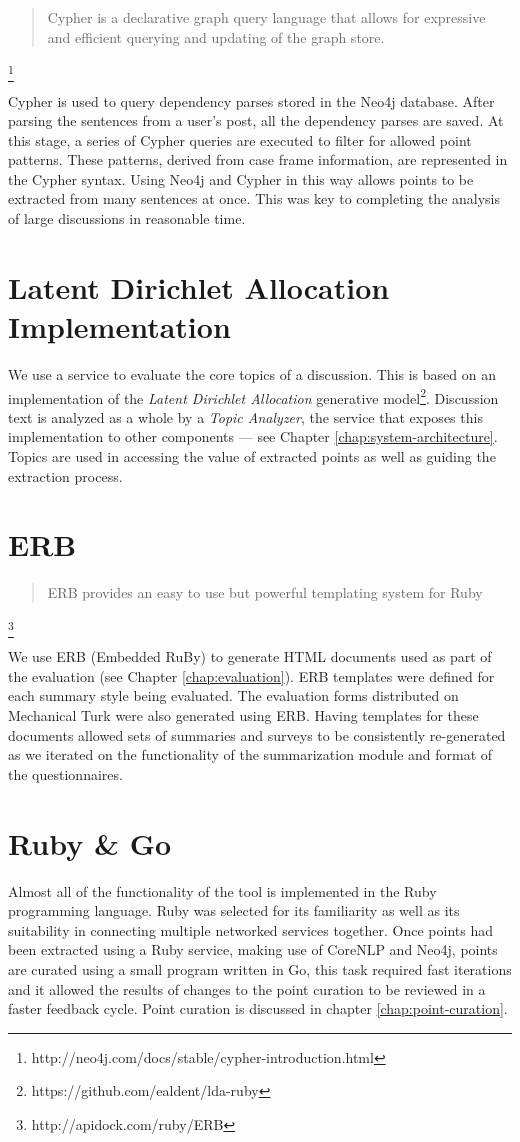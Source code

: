     \blockquote{Cypher is a declarative graph query language that allows for expressive and efficient querying and updating of the graph store.}\footnote{http://neo4j.com/docs/stable/cypher-introduction.html}

    Cypher is used to query dependency parses stored in the Neo4j database. After parsing the sentences from a user's post, all the dependency parses are saved. At this stage, a series of Cypher queries are executed to filter for allowed point patterns. These patterns, derived from case frame information, are represented in the Cypher syntax. Using Neo4j and Cypher in this way allows points to be extracted from many sentences at once. This was key to completing the analysis of large discussions in reasonable time.

  \tocless\section{Latent Dirichlet Allocation Implementation}
    We use a service to evaluate the core topics of a discussion. This is based on an implementation of the \textit{Latent Dirichlet Allocation} generative model\footnote{https://github.com/ealdent/lda-ruby}. Discussion text is analyzed as a whole by a \textit{Topic Analyzer}, the service that exposes this implementation to other components --- see Chapter \ref{chap:system-architecture}. Topics are used in accessing the value of extracted points as well as guiding the extraction process.

  \tocless\section{ERB}
    \blockquote{ERB provides an easy to use but powerful templating system for Ruby}\footnote{http://apidock.com/ruby/ERB}

    We use ERB (Embedded RuBy) to generate HTML documents used as part of the evaluation (see Chapter \ref{chap:evaluation}). ERB templates were defined for each summary style being evaluated. The evaluation forms distributed on Mechanical Turk were also generated using ERB. Having templates for these documents allowed sets of summaries and surveys to be consistently re-generated as we iterated on the functionality of the summarization module and format of the questionnaires.

  \tocless\section{Ruby \& Go}
    Almost all of the functionality of the tool is implemented in the Ruby programming language. Ruby was selected for its familiarity as well as its suitability in connecting multiple networked services together. Once points had been extracted using a Ruby service, making use of CoreNLP and Neo4j, points are curated using a small program written in Go, this task required fast iterations and it allowed the results of changes to the point curation to be reviewed in a faster feedback cycle. Point curation is discussed in chapter \ref{chap:point-curation}.

